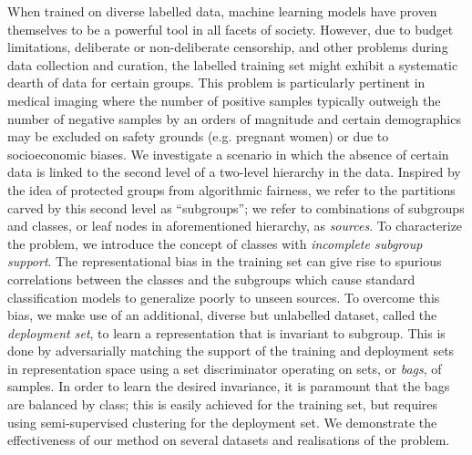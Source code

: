 \noindent
%
When trained on diverse labelled data, machine learning models have proven themselves to be a
powerful tool in all facets of society.
%
However, due to budget limitations, deliberate or non-deliberate censorship, and other problems
during data collection and curation, the labelled training set might exhibit a systematic dearth of
data for certain groups. This problem is particularly pertinent in medical imaging where the number
of positive samples typically outweigh the number of negative samples by an orders of magnitude and
certain demographics may be excluded on safety grounds (e.g. pregnant women) or due to
socioeconomic biases.
%
We investigate a scenario in which the absence of certain data is linked to the second level of a
two-level hierarchy in the data.
%
Inspired by the idea of protected groups from algorithmic fairness, we refer to the partitions
carved by this second level as ``subgroups''; we refer to combinations of subgroups and classes, or
leaf nodes in aforementioned hierarchy, as \emph{sources}.
%
To characterize the problem, we introduce the concept of classes with \emph{incomplete subgroup
support}. The representational bias in the training set can give rise to spurious correlations
between the classes and the subgroups which cause standard classification models to generalize
poorly to unseen sources.
%
To overcome this bias, we make use of an additional, diverse but unlabelled dataset, called the
\emph{deployment set}, to learn a representation that is invariant to subgroup. This is done by
adversarially matching the support of the training and deployment sets in representation space
using a set discriminator operating on sets, or \emph{bags}, of samples.
%
In order to learn the desired invariance, it is paramount that the bags are balanced by class; this
is easily achieved for the training set, but requires using semi-supervised clustering for the
deployment set.
%
We demonstrate the effectiveness of our method on several datasets and
realisations of the problem.
